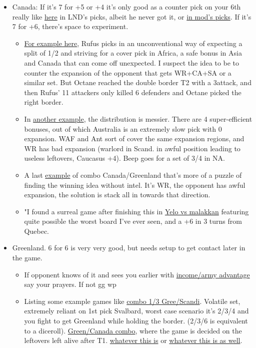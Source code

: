 \begin{itemize}
    \item Canada: If it's 7 for +5 or +4 it's only good as a counter pick on your 6th really like \href{https://www.warzone.com/MultiPlayer?GameID=38731303}{here} in LND's picks, albeit he never got it, or \href{https://www.warzone.com/MultiPlayer?GameID=25588607}{in mod's picks}. If it's 7 for +6, there's space to experiment. 
    \begin{itemize}
        \item \href{https://www.warzone.com/MultiPlayer?GameID=22899460}{For example here}, Rufus picks in an unconventional way of expecting a split of 1/2 and striving for a cover pick in Africa, a safe bonus in Asia and Canada that can come off unexpected. I suspect the idea to be to counter the expansion of the opponent that gets WR+CA+SA or a similar set. But Octane reached the double border T2 with a 3attack, and then Rufus' 11 attackers only killed 6 defenders and Octane picked the right border. 
        \item In \href{https://www.warzone.com/MultiPlayer?GameID=26307050}{another example}, the distribution is messier. There are 4 super-efficient bonuses, out of which Australia is an extremely slow pick with 0 expansion. WAF and Ant sort of cover the same expansion regions, and WR has bad expansion (warlord in Scand. in awful position leading to useless leftovers, Caucasus +4). Beep goes for a set of 3/4 in NA. 
        \item A last \href{https://www.warzone.com/MultiPlayer?GameID=28054520}{example} of combo Canada/Greenland that's more of a puzzle of finding the winning idea without intel. It's WR, the opponent has awful expansion, the solution is stack all in towards that direction.
        \item "I found a surreal game after finishing this in \href{https://www.warzone.com/MultiPlayer?GameID=30043599}{Yelo vs malakkan} featuring quite possible the worst board I've ever seen, and a +6 in 3 turns from Quebec.
    \end{itemize}
    \item Greenland. 6 for 6 is very very good, but needs setup to get contact later in the game. 
    \begin{itemize}
        \item If opponent knows of it and sees you earlier with \href{https://www.warzone.com/MultiPlayer?GameID=41513105}{income/army advantage} say your prayers. If not gg wp
        \item Listing some example games like \href{https://www.warzone.com/MultiPlayer?GameID=38698474}{combo 1/3 Gree/Scandi}. Volatile set, extremely reliant on 1st pick Svalbard, worst case scenario it's 2/3/4 and you fight to get Greenland while holding the border. (2/3/6 is equivalent to a diceroll). \href{https://www.warzone.com/MultiPlayer?GameID=37060731}{Green/Canada combo}, where the game is decided on the leftovers left alive after T1. \href{https://www.warzone.com/MultiPlayer?GameID=31336179}{whatever this is} or \href{https://www.warzone.com/MultiPlayer?GameID=33030404}{whatever this is as well}.

\end{itemize}
\end{itemize}
